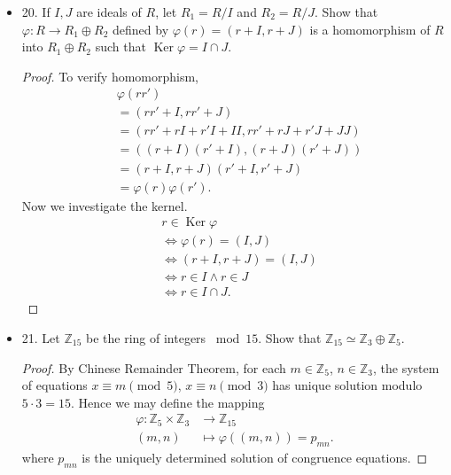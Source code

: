 \begin{itemize}
\begin{proof}
	To verify surjectivity onto $\{(r,0): r \in R\} $, fix any $(r, 0)$, and note that $\varphi(r) = (r, 0)$.

	To verify it is an ideal, it is a normal subgroup of the abelian additive group by previous knowledge. Now fix any $(r, s) \in R \oplus S$. Now
	\[
		(r', 0)(r, s) = (r'r, 0 s) = (r'r, 0) \in \{(r,0): r \in R\} 
	.\] 
	The other side is similar. Hence an isomorphism. The proof for $S$ is similar.
\end{proof}

\item 20. If $I, J$ are ideals of $R$, let $R_1=R / I$ and $R_2=R / J$. Show that $\varphi: R \rightarrow R_1 \oplus R_2$ defined by $\varphi(r)=(r+I, r+J)$ is a homomorphism of $R$ into $R_1 \oplus R_2$ such that $\operatorname{Ker} \varphi=I \cap J$.
\begin{proof}
	To verify homomorphism, 
	\begin{align*}
		&\varphi(r r') \\
		&= (r r'+I, r r' + J)\\
		&= (rr' + rI + r'I + II, rr'+rJ+r'J+JJ)\\
		&= ((r+I)(r'+I), (r+J)(r'+J))\\
		&= (r+I, r+J)(r'+I, r'+J)\\
		&= \varphi(r)\varphi(r')
	.\end{align*} 
	Now we investigate the kernel.
	\begin{align*}
		& r \in \operatorname{Ker} \varphi \\
		&\iff \varphi(r) = (I, J) \\
		&\iff (r+I, r+J) = (I, J) \\
		&\iff r \in I \land r \in J \\
		&\iff r \in I \cap J 
	.\end{align*}
\end{proof}

\item 21. Let $\mathbb{Z}_{15}$ be the ring of integers $\bmod 15$. Show that $\mathbb{Z}_{15} \simeq \mathbb{Z}_3 \oplus \mathbb{Z}_5$.
\begin{proof}
	By Chinese Remainder Theorem, for each $m \in \mathbb{Z}_5$, $n \in \mathbb{Z}_3$, the system of equations $x \equiv m \pmod 5$, $x \equiv n \pmod 3$ has unique solution modulo  $5 \cdot 3 = 15$. Hence we may define the mapping 
	\begin{align*}
		\varphi: \mathbb{Z}_{5}\times \mathbb{Z}_3 &\longrightarrow \mathbb{Z}_{15} \\
		(m,n) &\longmapsto \varphi((m,n)) = p_{mn}
	.\end{align*}
	where $p_{mn}$ is the uniquely determined solution of congruence equations.


\end{proof}
\end{itemize}
